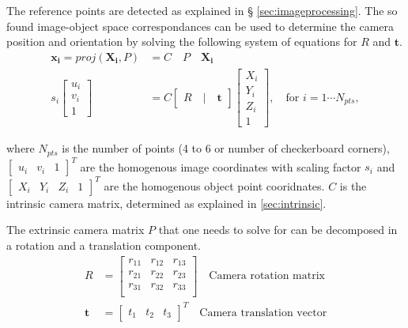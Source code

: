 The reference points are detected as explained in § \ref{sec:imageprocessing}. The so found image-object space correspondances can be used to determine the camera position and orientation by solving the following system of equations for $R$ and $\mathbf{t}$.
\begin{align}
    \mathbf{x_i} = proj(\mathbf{X_i},P)& = C \quad P \quad \mathbf{X_i} \\
    s_i \begin{bmatrix} u_i \\ v_i \\ 1 \end{bmatrix} &= 
    C \begin{bmatrix} R \quad|\quad \mathbf{t} \end{bmatrix}
    \begin{bmatrix} X_i \\ Y_i \\  Z_i \\ 1 \end{bmatrix}, \quad \text{for }i=1\cdots N_{pts},
    \label{eq:projection}
\end{align}

where $N_{pts}$ is the number of points (4 to 6 or number of checkerboard corners), 
$\begin{bmatrix} u_i & v_i & 1 \end{bmatrix} ^T$ are the homogenous image coordinates with scaling factor $s_i$ and $\begin{bmatrix} X_i & Y_i &  Z_i & 1 \end{bmatrix} ^T$ are the homogenous object point cooridnates. $C$ is the intrinsic camera matrix, determined as explained in \ref{sec:intrinsic}.

The extrinsic camera matrix $P$ that one needs to solve for can be decomposed in a rotation and a translation component.
\begin{align}
    R &= \begin{bmatrix} 
        r_{11} & r_{12} & r_{13} \\
        r_{21} & r_{22} & r_{23} \\
        r_{31} & r_{32} & r_{33} \\
    \end{bmatrix} \quad \text{Camera rotation matrix}\\
    \mathbf{t} &= \begin{bmatrix} 
        t_1 & t_2 & t_3
    \end{bmatrix} ^T \quad \text{Camera translation vector}
    \label{eq:solvepnp}
\end{align}

